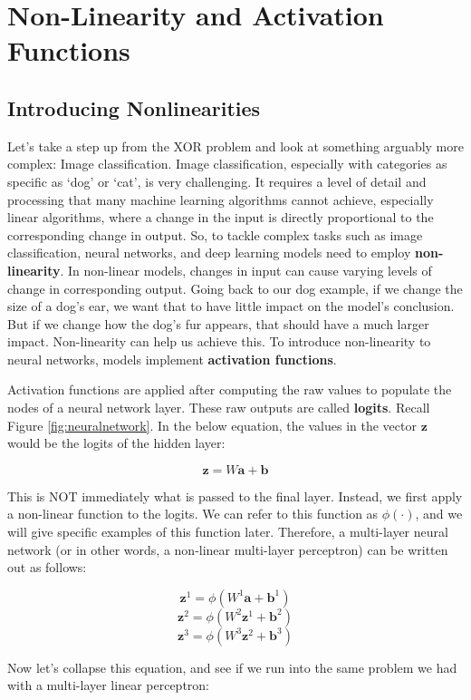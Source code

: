 \section{Non-Linearity and Activation Functions}
\subsection{Introducing Nonlinearities}
\begin{flushleft}
    \large Let's take a step up from the XOR problem and look at something arguably more complex: Image classification. Image classification, especially with categories as specific as `dog' or `cat', is very challenging. It requires a level of detail and processing that many machine learning algorithms cannot achieve, especially linear algorithms, where a change in the input is directly proportional to the corresponding change in output. So, to tackle complex tasks such as image classification, neural networks, and deep learning models need to employ \textbf{non-linearity}. In non-linear models, changes in input can cause varying levels of change in corresponding output. Going back to our dog example, if we change the size of a dog's ear, we want that to have little impact on the model's conclusion. But if we change how the dog's fur appears, that should have a much larger impact. Non-linearity can help us achieve this. To introduce non-linearity to neural networks, models implement \textbf{activation functions}. \break
    
    Activation functions are applied after computing the raw values to populate the nodes of a neural network layer. These raw outputs are called \textbf{logits}. Recall Figure \ref{fig:neuralnetwork}. In the below equation, the values in the vector $\textbf{z}$ would be the logits of the hidden layer:

    $$\textbf{z} = W\textbf{a} + \textbf{b}$$

    This is NOT immediately what is passed to the final layer. Instead, we first apply a non-linear function to the logits. We can refer to this function as $\phi(\cdot)$, and we will give specific examples of this function later. Therefore, a multi-layer neural network (or in other words, a non-linear multi-layer perceptron) can be written out as follows:

    $$\textbf{z}^1 = \phi(W^1\textbf{a} + \textbf{b}^1)$$
    $$\textbf{z}^2 = \phi(W^2\textbf{z}^1 + \textbf{b}^2)$$
    $$\textbf{z}^3 = \phi(W^3\textbf{z}^2 + \textbf{b}^3)$$

    Now let's collapse this equation, and see if we run into the same problem we had with a multi-layer linear perceptron:


\end{flushleft}
